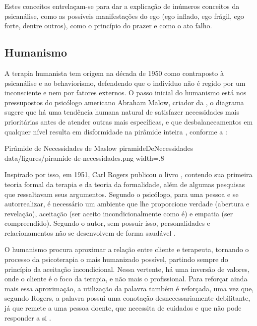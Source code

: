 Estes conceitos entrelaçam-se para dar a explicação de inúmeros conceitos da psicanálise, como as possíveis manifestações do ego (ego inflado, ego frágil, ego forte, dentre outros), como o princípio do prazer e como o ato falho.

\subsection{Humanismo}
\label{sec:Humanismo}
A terapia humanista tem origem na década de 1950 como contraposto à psicanálise e ao behaviorismo, defendendo que o indivíduo não é regido por um inconsciente e nem por fatores externos. O passo inicial do humanismo está nos pressupostos do psicólogo americano Abraham Malow, criador da  \cite{Pimenta2019}, o diagrama sugere que há uma tendência humana natural de satisfazer necessidades mais prioritárias antes de atender outras mais específicas, e que desbalanceamentos em qualquer nível resulta em disformidade na pirâmide inteira \cite{Mcleod2023}, conforme a :

\image
    {Pirâmide de Necessidades de Maslow}
    {piramideDeNecessidades}
    {data/figures/piramide-de-necessidades.png}
    {width=.8\textwidth}
    {}

Inspirado por isso, em 1951, Carl Rogers publicou o livro , contendo sua primeira teoria formal da terapia e da teoria da formalidade, além de algumas pesquisas que ressaltavam seus argumentos. Segundo o psicólogo, para uma pessoa  e se autorrealizar, é necessário um ambiente que lhe proporcione verdade (abertura e revelação), aceitação (ser aceito incondicionalmente como é) e empatia (ser compreendido). Segundo o autor, sem possuir isso, personalidades e relacionamentos não se desenvolvem de forma saudável \cite{Pimenta2019}.

O humanismo procura aproximar a relação entre cliente e terapeuta, tornando o processo da psicoterapia o mais humanizado possível, partindo sempre do princípio da aceitação incondicional. Nessa vertente, há uma inversão de valores, onde o cliente é o foco da terapia, e não mais o profissional. Para reforçar ainda mais essa aproximação, a utilização da palavra  também é reforçada, uma vez que, segundo Rogers, a palavra  possui uma conotação desnecessariamente debilitante, já que remete a uma pessoa doente, que necessita de cuidados e que não pode responder a si \cite{Barros2022}.

